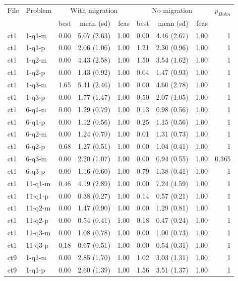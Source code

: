 \begin{tabular}{llrrrrrrr}
\hline
File & Problem & \multicolumn{3}{c}{With migration} & \multicolumn{3}{c}{No migration} & $p_{Holm}$\\
 & & best & mean (sd) & feas & best & mean (sd) & feas & \\
\hline
ct1 & 1-q1-m & 0.00 & 5.07 (2.63) & 1.00 & 0.00 & 4.46 (2.67) & 1.00 & 1\\
ct1 & 1-q1-p & 0.00 & 2.06 (1.06) & 1.00 & 1.21 & 2.30 (0.96) & 1.00 & 1\\
ct1 & 1-q2-m & 0.00 & 4.43 (2.58) & 1.00 & 1.50 & 3.54 (1.62) & 1.00 & 1\\
ct1 & 1-q2-p & 0.00 & 1.43 (0.92) & 1.00 & 0.04 & 1.47 (0.93) & 1.00 & 1\\
ct1 & 1-q3-m & 1.65 & 5.41 (2.46) & 1.00 & 0.00 & 4.60 (2.78) & 1.00 & 1\\
ct1 & 1-q3-p & 0.00 & 1.77 (1.47) & 1.00 & 0.50 & 2.07 (1.05) & 1.00 & 1\\
ct1 & 6-q1-m & 0.00 & 1.29 (0.79) & 1.00 & 0.13 & 0.98 (0.56) & 1.00 & 1\\
ct1 & 6-q1-p & 0.00 & 1.12 (0.56) & 1.00 & 0.25 & 1.15 (0.56) & 1.00 & 1\\
ct1 & 6-q2-m & 0.00 & 1.24 (0.79) & 1.00 & 0.01 & 1.31 (0.73) & 1.00 & 1\\
ct1 & 6-q2-p & 0.68 & 1.27 (0.51) & 1.00 & 0.00 & 1.04 (0.41) & 1.00 & 1\\
ct1 & 6-q3-m & 0.00 & 2.20 (1.07) & 1.00 & 0.00 & 0.94 (0.55) & 1.00 & 0.365\\
ct1 & 6-q3-p & 0.00 & 1.16 (0.60) & 1.00 & 0.79 & 1.38 (0.41) & 1.00 & 1\\
ct1 & 11-q1-m & 0.46 & 4.19 (2.89) & 1.00 & 0.00 & 7.24 (4.59) & 1.00 & 1\\
ct1 & 11-q1-p & 0.00 & 0.38 (0.27) & 1.00 & 0.14 & 0.57 (0.21) & 1.00 & 1\\
ct1 & 11-q2-m & 0.00 & 1.47 (0.90) & 1.00 & 0.00 & 1.29 (0.81) & 1.00 & 1\\
ct1 & 11-q2-p & 0.00 & 0.54 (0.41) & 1.00 & 0.18 & 0.47 (0.24) & 1.00 & 1\\
ct1 & 11-q3-m & 0.00 & 1.08 (0.78) & 1.00 & 0.00 & 1.00 (0.73) & 1.00 & 1\\
ct1 & 11-q3-p & 0.18 & 0.67 (0.51) & 1.00 & 0.00 & 0.54 (0.31) & 1.00 & 1\\
ct9 & 1-q1-m & 0.00 & 2.85 (1.70) & 1.00 & 1.02 & 3.03 (1.31) & 1.00 & 1\\
ct9 & 1-q1-p & 0.00 & 2.60 (1.39) & 1.00 & 1.56 & 3.51 (1.37) & 1.00 & 1\\

\end{tabular}
